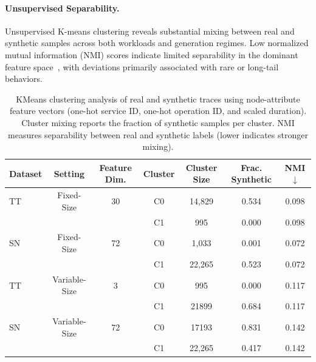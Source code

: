 \documentclass[sigconf,review]{acmart}
\begin{document}
\paragraph{Unsupervised Separability.}
Unsupervised K-means clustering reveals substantial mixing between real and synthetic samples across both workloads and generation regimes. Low normalized mutual information (NMI) scores indicate limited separability in the dominant feature space~\cite{arbelaitz2013extensive}, with deviations primarily associated with rare or long-tail behaviors.

\begin{table}
    \centering
    \renewcommand{\arraystretch}{1.2}
    \begin{tabular}{lcccccc}
        \hline
        \textbf{Dataset} &
        \textbf{Setting} &
        \textbf{Feature Dim.} &
        \textbf{Cluster} &
        \textbf{Cluster Size} &
        \textbf{Frac. Synthetic} &
        \textbf{NMI} $\downarrow$ \\
        \hline
        TT & Fixed-Size & 30
        & C0 & 14,829 & 0.534 & 0.098 \\
           &            &
        & C1 & 995 & 0.000 & 0.098 \\

        \hline
        SN & Fixed-Size & 72
        & C0 & 1,033 & 0.001 & 0.072 \\
           &            &
        & C1 & 22,265 & 0.523 & 0.072 \\

        \hline
        TT & Variable-Size & 3
        & C0 & 995 & 0.000 & 0.117 \\
           &            &
        & C1 & 21899 & 0.684 & 0.117 \\

        \hline
        SN & Variable-Size & 72
        & C0 & 17193 & 0.831 & 0.142 \\
           &            &
        & C1 & 22,265 & 0.417 & 0.142 \\
    \end{tabular}
    
    \caption{KMeans clustering analysis of real and synthetic traces using node-attribute feature vectors (one-hot service ID, one-hot operation ID, and scaled duration). Cluster mixing reports the fraction of synthetic samples per cluster. NMI measures separability between real and synthetic labels (lower indicates stronger mixing).}
    \label{tab:kmeans-mixing}
\end{table}
\end{document}
